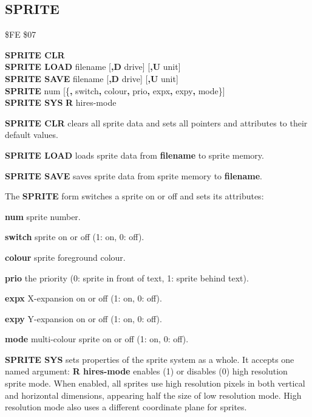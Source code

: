 \subsection{SPRITE}
\begin{description}[leftmargin=2cm,style=nextline]
\item [Token:]    \$FE \$07

\item [Format:]   {\bf SPRITE CLR} \\
                  {\bf SPRITE LOAD} filename [{\bf,D} drive] [{\bf,U} unit] \\
                  {\bf SPRITE SAVE} filename [{\bf,D} drive] [{\bf,U} unit] \\
                  {\bf SPRITE} num [\{{\bf,} switch{\bf,} colour{\bf,} prio{\bf,} expx{\bf,} expy{\bf,} mode\}] \\
                  {\bf SPRITE SYS} {\bf R} hires-mode \\

\item [Usage:]    {\bf SPRITE CLR} clears all sprite data and sets all pointers and attributes to their default values.

                  {\bf SPRITE LOAD } loads sprite data from {\bf filename} to sprite memory.

                  {\bf SPRITE SAVE } saves sprite data from sprite memory to {\bf filename}.

                  \filenamedefinition

                  The {\bf SPRITE} form switches a sprite on or off and sets its attributes:

                  {\bf num} sprite number.

                  {\bf switch} sprite on or off (1: on, 0: off).

                  {\bf colour} sprite foreground colour.

                  {\bf prio} the priority (0: sprite in front of text, 1: sprite behind text).

                  {\bf expx} X-expansion on or off (1: on, 0: off).

                  {\bf expy} Y-expansion on or off (1: on, 0: off).

                  {\bf mode} multi-colour sprite on or off (1: on, 0: off).

                  {\bf SPRITE SYS} sets properties of the sprite system as a whole. It accepts one named argument: {\bf R hires-mode} enables (1) or disables (0) high resolution sprite mode. When enabled, all sprites use high resolution pixels in both vertical and horizontal dimensions, appearing half the size of low resolution mode. High resolution mode also uses a different coordinate plane for sprites.


\end{description}
